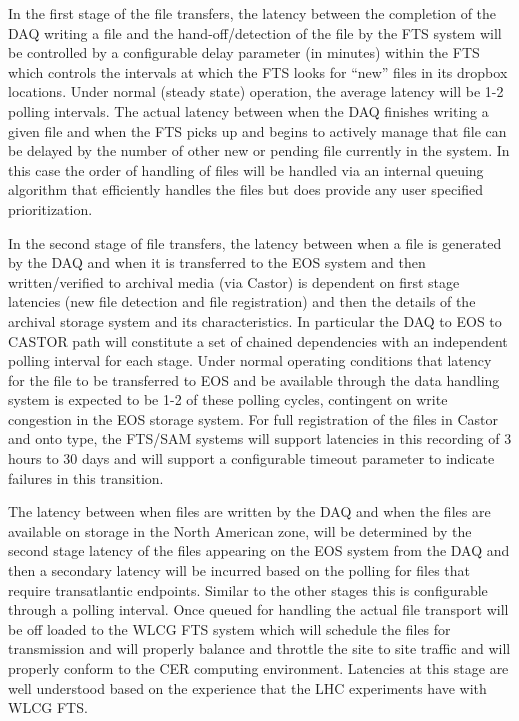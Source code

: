 \documentclass[pdftex,12pt,letter]{article}
\begin{document}
In the first stage of the file transfers, the latency between the completion of the DAQ writing a file and the hand-off/detection of the file by the
FTS system will be controlled by a configurable delay parameter (in minutes) within the FTS which controls the intervals at which the FTS looks for
``new'' files in its dropbox locations.  Under normal (steady state) operation, the average latency will be 1-2 polling intervals.
The actual latency between when the DAQ finishes writing a given file and when the FTS picks up and begins to actively manage
that file can be delayed by the number of other new or pending file currently in the system.  In this case the order of handling of
files will be handled via an internal queuing algorithm that efficiently handles the files but does provide any user specified prioritization.

In the second stage of file transfers, the latency between when a file is generated by the DAQ and when it is transferred to the EOS
system and then written/verified to archival media (via Castor) is dependent on first stage latencies (new file detection and file registration)
and then the details of the archival storage system and its characteristics.  In particular the DAQ to EOS to CASTOR path will constitute a set
of chained dependencies with an independent polling interval for each stage.  Under normal operating conditions that latency for the file to
be transferred to EOS and be available through the data handling system is expected to be 1-2 of these polling cycles, contingent on write
congestion in the EOS storage system.   For full registration of the files in Castor and onto type, the FTS/SAM systems will support latencies
in this recording of 3 hours to 30 days and will support a configurable timeout parameter to indicate failures in this transition.

The latency between when files are written by the DAQ and when the files are available on storage in the North American zone,
will be determined by the second stage latency of the files appearing on the EOS system from the DAQ and then a secondary latency
will be incurred based on the polling for files that require transatlantic endpoints.  Similar to the other stages this is configurable
through a polling interval.  Once queued for handling the actual file transport will be off loaded to the WLCG FTS system which will
schedule the files for transmission and will properly balance and throttle the site to site traffic and will properly conform to the CER
 computing environment.  Latencies at this stage are well understood based on the experience that the LHC experiments have with WLCG FTS.  
\end{document}

